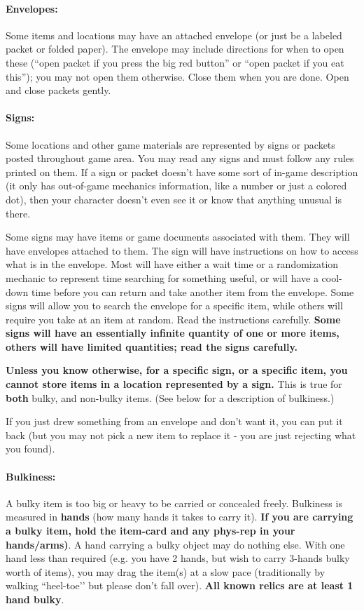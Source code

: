 \documentclass[sheet]{GL2020}
\begin{document}
\paragraph{Envelopes:} Some items and locations may have an attached envelope (or just be a labeled packet or folded paper). The envelope may include directions for when to open these (``open packet if you press the big red button'' or ``open packet if you eat this''); you may not open them otherwise. Close them when you are done. Open and close packets gently.

\paragraph{Signs:} Some locations and other game materials are represented by signs or packets posted throughout game area. You may read any signs and must follow any rules printed on them. If a sign or packet doesn't have some sort of in-game description (it only has out-of-game mechanics information, like a number or just a colored dot), then your character doesn't even see it or know that anything unusual is there.

Some signs may have items or game documents associated with them. They will have envelopes attached to them. The sign will have instructions on how to access what is in the envelope. Most will have either a wait time or a randomization mechanic to represent time searching for something useful, or will have a cool-down time before you can return and take another item from the envelope. Some signs will allow you to search the envelope for a specific item, while others will require you take at an item at random. Read the instructions carefully. \textbf{Some signs will have an essentially infinite quantity of one or more items, others will have limited quantities; read the signs carefully.}

\textbf{Unless you know otherwise, for a specific sign, or a specific item, you cannot store items in a location represented by a sign.} This is true for \textbf{both} bulky, and non-bulky items. (See below for a description of bulkiness.)

If you just drew something from an envelope and don't want it, you can put it back (but you may not pick a new item to replace it - you are just rejecting what you found).

\paragraph{Bulkiness:} A bulky item is too big or heavy to be carried or concealed freely. Bulkiness is measured in {\bf hands} (how many hands it takes to carry it). \textbf{If you are carrying a bulky item, hold the item-card and any phys-rep in your hands/arms)}. A hand carrying a bulky object may do nothing else. With one hand less than required (e.g. you have 2 hands, but wish to carry 3-hands bulky worth of items), you may drag the item(s) at a slow pace (traditionally by walking ``heel-toe'’ but please don’t fall over). \textbf{All known relics are at least 1 hand bulky}.
\end{document}
